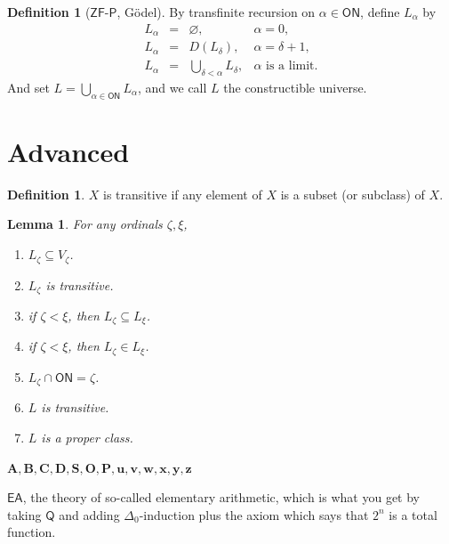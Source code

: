 \documentclass[12pt]{article}
\newtheorem{lemma}[theorem]{Lemma}
\theoremstyle{definition}
\newtheorem{definition}[theorem]{Definition}
\begin{document}
\begin{definition}[$\mathsf{ZF}$-$\mathsf{P}$, G\"odel]
	By transfinite recursion on $\alpha\in\mathsf{ON}$, 
	define $L_\alpha$ by
	\begin{equation*}
	\begin{array}{rcll}
	L_\alpha&=&\varnothing,&\alpha=0,\\
	L_{\alpha}&=&D(L_\delta),&\alpha=\delta+1,\\
	L_\alpha&=&\bigcup_{\delta<\alpha}L_\delta,&\alpha\text{ is a limit}.
	\end{array}
	\end{equation*}
	And set $L=\bigcup_{\alpha\in\mathsf{ON}}L_\alpha$, and we call $L$ the constructible universe.
\end{definition}

\section*{Advanced}
\begin{definition}
	$X$ is transitive if any element of $X$ is a subset (or subclass) of $X$.
\end{definition}

\begin{lemma}
	For any ordinals $\zeta,\xi$,
	\begin{enumerate}
		\item $L_\zeta\subseteq V_\zeta$.
		\item $L_\zeta$ is transitive.
		\item if $\zeta<\xi$, then $L_\zeta\subseteq L_\xi$.
		\item if $\zeta<\xi$, then $L_\zeta\in L_\xi$.
		\item $L_\zeta\cap\mathsf{ON}=\zeta$.
		\item $L$ is transitive.
		\item $L$ is a proper class.
	\end{enumerate}
\end{lemma}
$\mathbf{A,B,C,D,S,O,P,u,v,w,x,y,z}$
\clearpage

$\mathsf{EA}$, the theory of so-called elementary arithmetic,
which is what you get by taking $\mathsf{Q}$ and adding $\Delta_0$-induction plus the axiom which says that $2^n$ is a total function.



\label{CC001}
\end{document}
